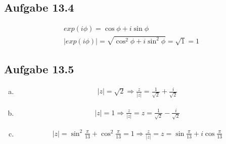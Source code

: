 \documentclass{standalone}
\begin{document}
\subsection{Aufgabe 13.4}
\begin{align}
exp(i\phi) = \cos \phi + i \sin \phi \\
|exp(i\phi)| = \sqrt{\cos^2 \phi + i\sin^2 \phi} = \sqrt{1} = 1
\end{align}
\subsection{Aufgabe 13.5}
\begin{enumerate}[a)]
\item \begin{align}
|z| = \sqrt{2} \Rightarrow \frac{z}{|z|} = \frac{1}{\sqrt{2}} + \frac{i}{\sqrt{2}}
\end{align}
\item \begin{align}
|z| = 1 \Rightarrow \frac{z}{|z|} = z = \frac{1}{\sqrt{2}} - \frac{i}{\sqrt{2}}
\end{align}
\item \begin{align}
|z| = \sin^2 \frac{\pi}{13} + \cos^2 \frac{\pi}{13} = 1 \Rightarrow \frac{z}{|z|} = z = \sin \frac{\pi}{13} + i \cos \frac{\pi }{13}
\end{align}
\end{enumerate}
\end{document}
